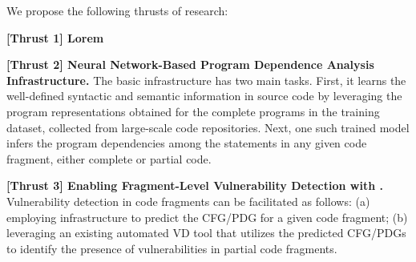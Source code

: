 We propose the following thrusts of research:

\vspace{3pt}
\noindent \textbf{[Thrust 1] Lorem}

\vspace{3pt}
\noindent \textbf{[Thrust 2] Neural Network-Based Program Dependence Analysis Infrastructure.} The basic infrastructure has two main tasks. First, it learns the well-defined syntactic and semantic information in source code by leveraging the program representations obtained for the complete programs in the training dataset, collected from large-scale code repositories. Next, one such trained model infers the program dependencies among the statements in any given code fragment, either complete or partial code.

\vspace{3pt}
\noindent \textbf{[Thrust 3] Enabling Fragment-Level Vulnerability Detection with \tool.} Vulnerability detection in code fragments can be facilitated as follows: (a) employing \tool infrastructure to predict the CFG/PDG for a given code fragment; (b) leveraging an existing automated VD tool that utilizes the predicted CFG/PDGs to identify the presence of vulnerabilities in partial code fragments.
